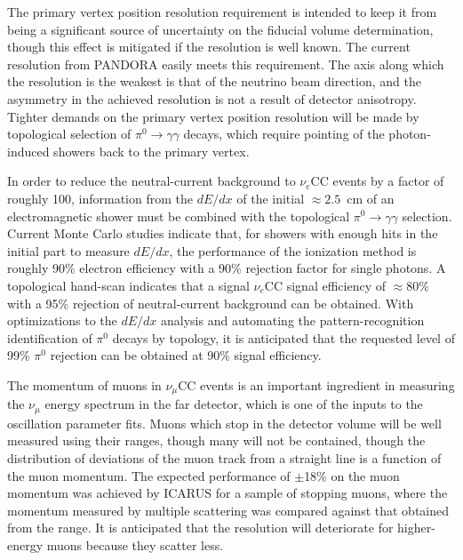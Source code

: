 The primary vertex position resolution requirement is intended 
to keep it from being a significant source of uncertainty on the
fiducial volume determination, though this effect is mitigated if the
resolution is well known.  The current resolution from PANDORA easily
meets this requirement.  The axis along which the resolution is the
weakest is that of the neutrino beam direction, and  the asymmetry in the
achieved resolution is not a result of detector anisotropy.   Tighter
demands on the primary vertex position resolution will be made by
topological selection of $\pi^0\rightarrow\gamma\gamma$ decays, which
require pointing of the photon-induced showers back to the primary
vertex.

In order to reduce the neutral-current background to $\nu_e$CC events
by a factor of roughly 100, information from the $dE/dx$ of the
initial $\approx 2.5$~cm of an electromagnetic shower must be combined
with the topological $\pi^0\rightarrow\gamma\gamma$
selection\cite{docdb-6954}.  Current Monte Carlo studies indicate
that, for showers with enough hits in the initial part to measure
$dE/dx$, the performance of the ionization method is roughly 90\%
electron efficiency with a 90\% rejection factor for single photons.
A topological hand-scan indicates that a signal $\nu_e$CC signal
efficiency of $\approx 80$\% with a 95\% rejection of neutral-current
background can be obtained.  With optimizations to the $dE/dx$
analysis and automating the pattern-recognition identification of
$\pi^0$ decays by topology, it is anticipated that the requested level
of 99\% $\pi^0$ rejection can be obtained at 90\% signal efficiency.

The momentum of muons in $\nu_\mu$CC events is an important ingredient
in measuring the $\nu_\mu$ energy spectrum in the far detector, which
is one of the inputs to the oscillation parameter fits.  Muons which
stop in the detector volume will be well measured using their ranges,
though many will not be contained, though the distribution of
deviations of the muon track from a straight line is a function of the
muon momentum.  
The expected performance of $\pm$18\% on the muon
momentum was achieved by ICARUS for a sample of stopping muons, where
the momentum measured by multiple scattering was  compared against
that obtained from the range.  It is anticipated that the resolution
will deteriorate for higher-energy muons because they scatter less.

